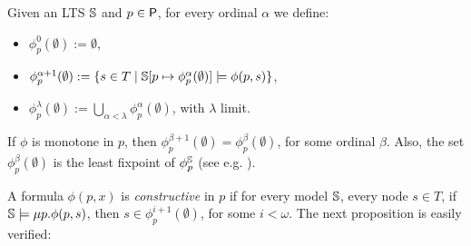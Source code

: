 %
%
%

\noindent Given an LTS $\mathbb{S}$ and $p\in \mathsf{P}$, for every ordinal $\alpha$ we define: %
 \begin{itemize}
\item $\phi^0_p(\emptyset):= \emptyset$,
\item $\phi_p^{\alpha+1}(\emptyset):= \{ s \in T \mid \mathbb{S}[p \mapsto \phi_p^\alpha(\emptyset)] \models \phi(p, s)\}$,
\item $\phi_p^{\lambda}(\emptyset):= \bigcup_{\alpha < \lambda} \phi_p^{\alpha}(\emptyset)$, with $\lambda$ limit.
\end{itemize}
If $\phi$ is monotone in $p$, then $\phi_p^{\beta+1}(\emptyset)= \phi_p^{\beta}(\emptyset)$, for some ordinal $\beta$. Also, the set $\phi_p^{\beta}(\emptyset)$ is the least fixpoint of $\phi^{\mathbb{S}}_p$ (see e.g. \cite{ArnoldN01}).



 A formula $\phi(p, x)$ is \emph{constructive} in $p$ if for every model $\mathbb{S}$,  every node $s \in T$, if $\mathbb{S} \models\mu p. \phi(p,s)$, then $s\in \phi_p^{i+1}(\emptyset)$, for some $i< \omega$.
The next proposition is easily verified:%



